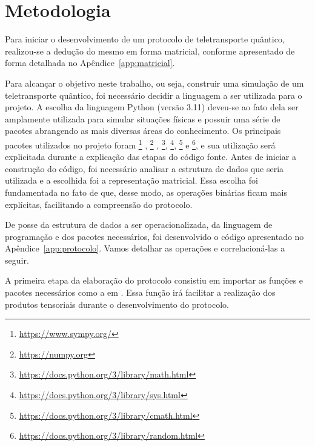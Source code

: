 
\chapter{Metodologia}

Para iniciar o desenvolvimento de um protocolo de teletransporte quântico, realizou-se a dedução do mesmo em forma matricial, conforme apresentado de forma detalhada no Apêndice~\ref{app:matricial}.

Para alcançar o objetivo neste trabalho, ou seja, construir uma simulação de um teletransporte quântico, foi necessário decidir a linguagem a ser utilizada para o projeto. A escolha da linguagem Python (versão 3.11) deveu-se ao fato dela ser amplamente utilizada para simular situações físicas e possuir uma série de pacotes abrangendo as mais diversas áreas do conhecimento. Os principais pacotes utilizados no projeto foram \footnote{\url{https://www.sympy.org/}} \cite{sympy}, \footnote{\url{https://numpy.org}} \cite{harris2020array}, \footnote{\url{https://docs.python.org/3/library/math.html}}, \footnote{\url{https://docs.python.org/3/library/sys.html}}, \footnote{\url{https://docs.python.org/3/library/cmath.html}} e \footnote{\url{https://docs.python.org/3/library/random.html}}, e sua utilização será explicitada durante a explicação das etapas do código fonte. Antes de iniciar a construção do código, foi necessário analisar a estrutura de dados que seria utilizada e a escolhida foi a representação matricial. Essa escolha foi fundamentada no fato de que, desse modo, as operações binárias ficam mais explícitas, facilitando a compreensão do protocolo.

De posse da estrutura de dados a ser operacionalizada, da linguagem de programação e dos pacotes necessários, foi desenvolvido o código apresentado no Apêndice~\ref{app:protocolo}. Vamos detalhar as operações e correlacioná-las a seguir.

A primeira etapa da elaboração do protocolo consistiu em importar as funções e pacotes necessários como a  em . Essa função irá facilitar a realização dos produtos tensoriais durante o desenvolvimento do protocolo.

